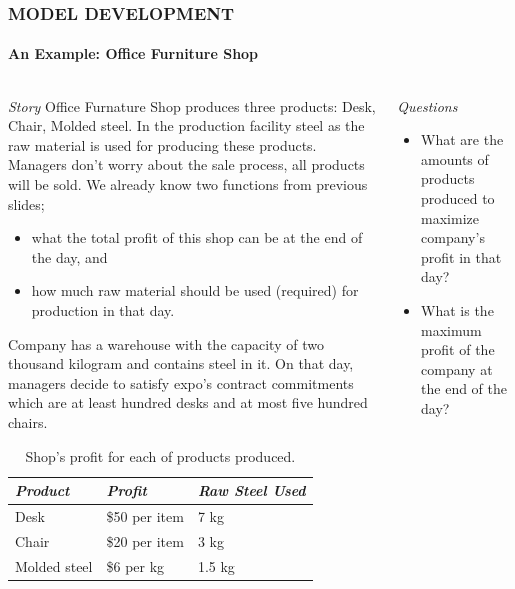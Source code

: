 \documentclass[14 pt]{beamer}
\begin{document}

\begin{frame}[t]
\frametitle{MODEL DEVELOPMENT}
\framesubtitle{An Example: Office Furniture Shop}

\begin{columns}[t]
\begin{column}{0.45\textwidth}
\emph{Story}
\vskip0.5cm%
Office Furnature Shop produces three products: Desk, Chair, Molded steel. In the production facility steel as the raw material is used for producing these products. Managers don't worry about the sale process, all products will be sold. We already know two functions from previous slides;
\begin{itemize}
  \item what the total profit of this shop can be at the end of the day, and
  \item how much raw material should be used (required) for production in that day.
\end{itemize}
Company has a warehouse with the capacity of two thousand kilogram and contains steel in it. On that day, managers decide to satisfy expo's contract commitments which are at least hundred desks and at most five hundred chairs.
\begin{table}
\begin{tabular}{p{}p{}p{}}
  \hline
  \emph{Product} & \emph{Profit} & \emph{Raw Steel Used} \\
  \hline
  Desk  & \$50 per item & 7 kg \\
  Chair & \$20 per item & 3 kg\\
  Molded steel & \$6 per kg & 1.5 kg\\
  \hline
\end{tabular}
\caption{Shop's profit for each of products produced.}  
\end{table}
\end{column}

\begin{column}{0.45\textwidth}
\emph{Questions}
\vskip0.5cm%
\begin{itemize}
  \item What are the amounts of products produced to maximize company's profit in that day?
  \item What is the maximum profit of the company at the end of the day?
\end{itemize}
\end{column}
\end{columns}
\end{frame}
\end{document}
